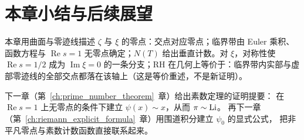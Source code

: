 \begin{center}
\end{center}

\section*{本章小结与后续展望}\label{sec:zero_distribution_summary}

本章用曲面与零迹线描述 $\zeta$ 与 $\xi$ 的零点：交点对应零点；临界带由 Euler 乘积、函数方程与 $\operatorname{Re}s=1$ 无零点确定；$N(T)$ 给出垂直计数。对 $\xi$，对称性使 $\operatorname{Re}s=1/2$ 成为 $\operatorname{Im}\xi=0$ 的一条分支；RH 在几何上等价于：临界带内实部与虚部零迹线的全部交点都落在该轴上（这是等价重述，不是新证明）。

下一章（第~\ref{ch:prime_number_theorem}~章）给出素数定理的证明提要：
在 $\operatorname{Re}s=1$ 上无零点的条件下建立 $\psi(x)\sim x$，从而 $\pi\sim\operatorname{Li}$。
再下一章（第~\ref{ch:riemann_explicit_formula}~章）用围道积分建立 $\psi_0$ 的显式公式，
把非平凡零点与素数计数函数直接联系起来。